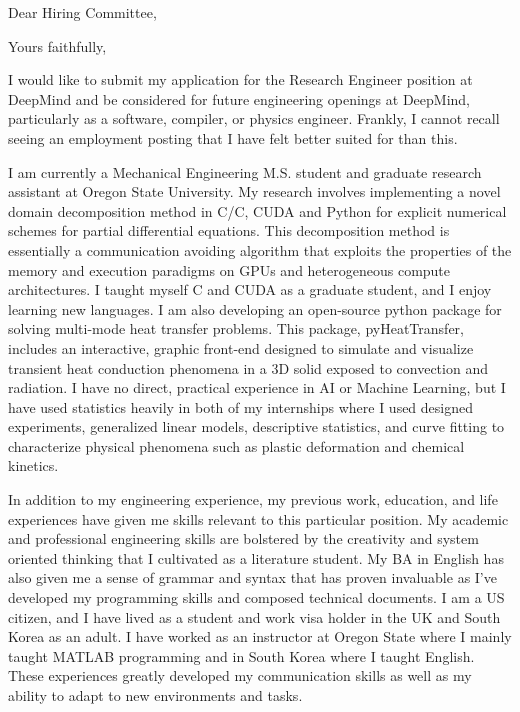 \documentclass[10pt,a4paper,sans]{moderncv}        %
\def\CC{{C\nolinebreak[4]\hspace{-.05em}\raisebox{.4ex}{\footnotesize ++}}}
\begin{document}
\date{\today}
\opening{Dear Hiring Committee,}
\closing{Yours faithfully,}

\makelettertitle

I would like to submit my application for the Research Engineer position at DeepMind and be considered for future engineering openings at DeepMind, particularly as a software, compiler, or physics engineer.
Frankly, I cannot recall seeing an employment posting that I have felt better suited for than this.

I am currently a Mechanical Engineering M.S. student and graduate research assistant at Oregon State University.  
My research involves implementing a novel domain decomposition method in C/\CC, CUDA and Python for explicit numerical schemes for partial differential equations.
This decomposition method is essentially a communication avoiding algorithm that exploits the properties of the memory and execution paradigms on GPUs and heterogeneous compute architectures.
I taught myself C and CUDA as a graduate student, and I enjoy learning new languages.
I am also developing an open-source python package for solving multi-mode heat transfer problems.
This package, pyHeatTransfer, includes an interactive, graphic front-end designed to simulate and visualize transient heat conduction phenomena in a 3D solid exposed to convection and radiation.
I have no direct, practical experience in AI or Machine Learning, but I have used statistics heavily in both of my internships where I used designed experiments, generalized linear models, descriptive statistics, and curve fitting to characterize physical phenomena such as plastic deformation and chemical kinetics.

In addition to my engineering experience, my previous work, education, and life experiences have given me skills relevant to this particular position. 
My academic and professional engineering skills are bolstered by the creativity and system oriented thinking that I cultivated as a literature student. 
My BA in English has also given me a sense of grammar and syntax that has proven invaluable as I've developed my programming skills and composed technical documents.
I am a US citizen, and I have lived as a student and work visa holder in the UK and South Korea as an adult.
I have worked as an instructor at Oregon State where I mainly taught MATLAB programming and in South Korea where I taught English. 
These experiences greatly developed my communication skills as well as my ability to adapt to new environments and tasks.
\end{document}
